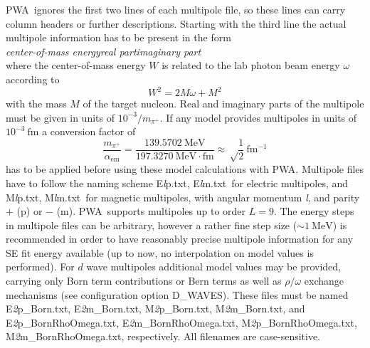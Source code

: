 \documentclass[a4paper,10pt]{article}
\def\PWA{\ttfamily PWA\rmfamily\ }
\def\bl{\phantom{0}}
\def\tt{\ttfamily}
\def\rm{\rmfamily}
\begin{document}
\PWA ignores the first two lines of each multipole file, so these lines can carry column headers or further descriptions.
Starting with the third line the actual multipole information has to be present in the form\\
\tt\textit{center-of-mass energy\bl\bl\bl\bl real part\bl\bl\bl\bl imaginary part}\rm\\
where the center-of-mass energy $W$ is related to the lab photon beam energy $\omega$ according to
\begin{displaymath}
 W^2 = 2M\omega + M^2
\end{displaymath}
with the mass $M$ of the target nucleon. Real and imaginary parts of the multipole must be given in units of
$10^{-3}/m_{\pi^+}$. If any model provides multipoles in units of $10^{-3}\:\mathrm{fm}$ a conversion factor of
\begin{displaymath}
 \frac{m_{\pi^+}}{\alpha_\mathrm{em}} =\frac{139.5702\:\mathrm{MeV}}{197.3270\:\mathrm{MeV\cdot fm}}
\approx \sqrt\frac{1}{2}\:\mathrm{fm^{-1}}
\end{displaymath}
has to be applied before using these model calculations with \tt PWA\rm.
Multipole files have to follow the naming scheme
\tt E\textit{l}p.txt\rm,
\tt E\textit{l}m.txt\rm\ 
for electric multipoles, and
\tt M\textit{l}p.txt\rm,
\tt M\textit{l}m.txt\rm\ 
for magnetic multipoles, with angular momentum \tt\textit{l}\rm, and parity 
$+$ (\tt p\rm) or $-$ (\tt m\rm).
\PWA supports multipoles up to order $L = 9$.
The energy steps in multipole files can be arbitrary, however a rather fine step size ($\sim 1\:\mathrm{MeV}$)
is recommended in order to have reasonably precise multipole information for any SE fit energy available
(up to now, no interpolation on model values is performed).
For $d$ wave multipoles additional model values may be provided, carrying only Born term contributions or Bern terms as well as 
$\rho/\omega$ exchange mechanisms (see configuration option \tt D\_WAVES\rm).
These files must be named
\tt E\textit{2}p\_Born.txt\rm,
\tt E\textit{2}m\_Born.txt\rm,
\tt M\textit{2}p\_Born.txt\rm,
\tt M\textit{2}m\_Born.txt\rm,
and
\tt E\textit{2}p\_BornRhoOmega.txt\rm,
\tt E\textit{2}m\_BornRhoOmega.txt\rm,
\tt M\textit{2}p\_BornRhoOmega.txt\rm,
\tt M\textit{2}m\_BornRhoOmega.txt\rm,
respectively.
All filenames are case-sensitive.
\end{document}
